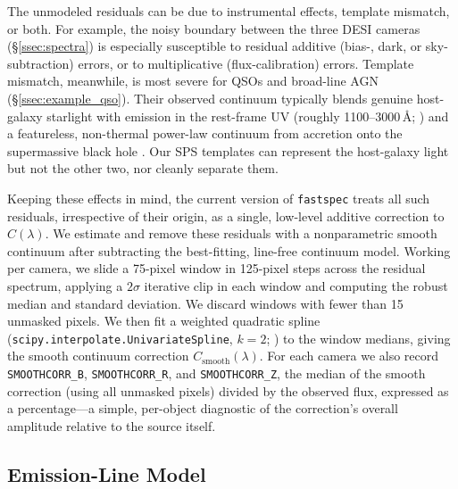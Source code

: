 \documentclass[modern,linenumbers]{aastex701}
\newcommand{\fastspec}{\texttt{fastspec}}
\begin{document}
The unmodeled residuals can be due to instrumental effects, template
mismatch, or both. For example, the noisy boundary between the three
DESI cameras (\S\ref{ssec:spectra}) is especially susceptible to
residual additive (bias-, dark, or sky-subtraction) errors, or to
multiplicative (flux-calibration) errors. Template mismatch,
meanwhile, is most severe for QSOs and broad-line AGN
(\S\ref{ssec:example_qso}). Their observed continuum typically blends
genuine host-galaxy starlight with  emission in the
rest-frame UV (roughly 1100--3000\,\AA; \citealt{vestergaard01a}) and
a featureless, non-thermal power-law continuum from accretion onto the
supermassive black hole \citep{vanden-berk01a}. Our SPS templates can
represent the host-galaxy light but not the other two, nor cleanly
separate them.

Keeping these effects in mind, the current version of \fastspec{}
treats all such residuals, irrespective of their origin, as a single,
low-level additive correction to $C(\lambda)$. We estimate and remove
these residuals with a nonparametric smooth continuum after
subtracting the best-fitting, line-free continuum model. Working per
camera, we slide a 75-pixel window in 125-pixel steps across the
residual spectrum, applying a $2\sigma$ iterative clip in each window
and computing the robust median and standard deviation. We discard
windows with fewer than 15 unmasked pixels. We then fit a weighted
quadratic spline (\texttt{scipy.interpolate.UnivariateSpline}, $k=2$;
\citealt{virtanen20a}) to the window medians, giving the smooth
continuum correction $C_\mathrm{smooth}(\lambda)$. For each camera we
also record \texttt{SMOOTHCORR\_B}, \texttt{SMOOTHCORR\_R}, and
\texttt{SMOOTHCORR\_Z}, the median of the smooth correction (using all
unmasked pixels) divided by the observed flux, expressed as a
percentage---a simple, per-object diagnostic of the correction's
overall amplitude relative to the source itself.

\subsection{Emission-Line Model}
\label{ssec:emlines}
\end{document}
